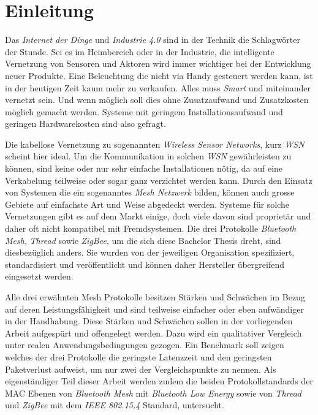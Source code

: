 \clearpage

\section{Einleitung}\label{sec:Einleitung}



Das \textit{Internet der Dinge} und \textit{Industrie 4.0} sind in der Technik die Schlagwörter der Stunde.
Sei es im Heimbereich oder in der Industrie, die intelligente Vernetzung von Sensoren und Aktoren wird immer wichtiger bei der Entwicklung neuer Produkte.
Eine Beleuchtung die nicht via Handy gesteuert werden kann, ist in der heutigen Zeit kaum mehr zu verkaufen.
Alles muss \textit{Smart} und miteinander vernetzt sein.
Und wenn möglich soll dies ohne Zusatzaufwand und Zusatzkosten möglich gemacht werden.
Systeme mit geringem Installationsaufwand und geringen Hardwarekosten sind also gefragt.

Die kabellose Vernetzung zu sogenannten \textit{Wireless Sensor Networks}, kurz \textit{WSN} scheint hier ideal.
Um die Kommunikation in solchen \textit{WSN} gewährleisten zu können, sind keine oder nur sehr einfache Installationen nötig, da auf eine Verkabelung teilweise oder sogar ganz verzichtet werden kann.
Durch den Einsatz von Systemen die ein sogenanntes \textit{Mesh Netzwerk} bilden, können auch grosse Gebiete auf einfachste Art und Weise abgedeckt werden. 
Systeme für solche Vernetzungen gibt es auf dem Markt einige, doch viele davon sind proprietär und daher oft nicht kompatibel mit Fremdsystemen.
Die drei Protokolle \textit{Bluetooth Mesh}, \textit{Thread} sowie \textit{ZigBee}, um die sich diese Bachelor Thesis dreht, sind diesbezüglich anders.
Sie wurden von der jeweiligen Organisation spezifiziert, standardisiert und veröffentlicht und können daher Hersteller übergreifend eingesetzt werden.

Alle drei erwähnten Mesh Protokolle besitzen Stärken und Schwächen im Bezug auf deren Leistungsfähigkeit und sind teilweise einfacher oder eben aufwändiger in der Handhabung.  
Diese Stärken und Schwächen sollen in der vorliegenden Arbeit aufgespürt und offengelegt werden.
Dazu wird ein qualitativer Vergleich unter realen Anwendungsbedingungen gezogen.
Ein Benchmark soll zeigen welches der drei Protokolle die geringste Latenzzeit und den geringsten Paketverlust aufweist, um nur zwei der Vergleichspunkte zu nennen.
Als eigenständiger Teil dieser Arbeit werden zudem die beiden Protokollstandards der MAC Ebenen von \textit{Bluetooth Mesh} mit \textit{Bluetooth Low Energy} sowie von \textit{Thread} und \textit{ZigBee} mit dem \textit{IEEE 802.15.4} Standard, untersucht.

